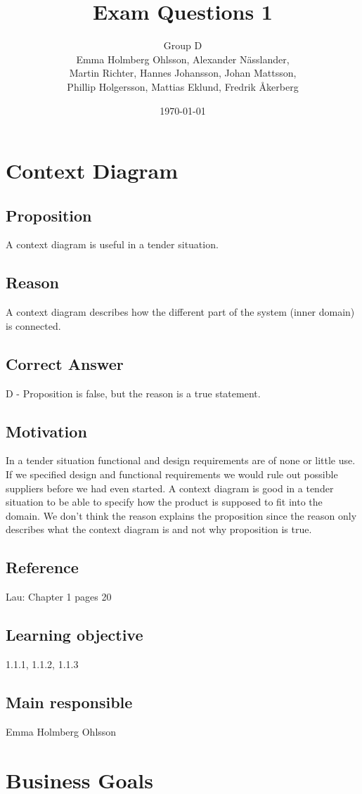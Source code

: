 \documentclass[a4paper]{article}
\title{Exam Questions 1}
\author{Group D\\ Emma Holmberg Ohlsson, Alexander Nässlander,\\Martin Richter, Hannes Johansson, Johan Mattsson,\\Phillip Holgersson, Mattias Eklund, Fredrik Åkerberg}
\date{\today}
\begin{document}
	\maketitle
	\thispagestyle{empty}
	\setcounter{page}{0}
	\pagebreak

\section{Context Diagram}
\subsection*{Proposition}
A context diagram is useful in a tender situation.
\subsection*{Reason}
A context diagram describes how the different part of the system (inner domain) is connected.
\subsection*{Correct Answer}
D - Proposition is false, but the reason is a true statement.
\subsection*{Motivation}
In a tender situation functional and design requirements are of none or little use. If we specified design and functional requirements we would rule out possible suppliers before we had even started.
A context diagram is good in a tender situation to be able to specify how the product is supposed to fit into the domain.
We don't think the reason explains the proposition since the reason only describes what the context diagram is and not why proposition is true.
\subsection*{Reference}
Lau: Chapter 1 pages 20
\subsection*{Learning objective}
1.1.1, 1.1.2, 1.1.3
\subsection*{Main responsible}
Emma Holmberg Ohlsson



\section{Business Goals}
\end{document}

